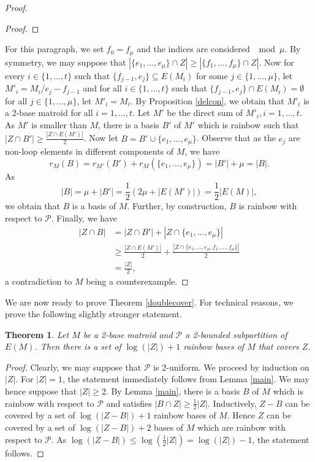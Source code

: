 \documentclass{article}
\newtheorem{Theorem}[Statement]{Theorem}
\begin{document}
\begin{proof}
\begin{proof}
\end{proof}

For this paragraph, we set $f_0=f_{\mu}$ and the indices are considered $\mod \mu$. By symmetry, we may suppose that $|\{e_1,\ldots,e_\mu\}\cap Z| \geq |\{f_1,\ldots,f_\mu\}\cap Z|$. Now for every $i \in \{1,\ldots,t\}$ such that $\{f_{j-1},e_j\}\subseteq E(M_i)$ for some $j \in \{1,\ldots,\mu\}$, let $M'_i=M_i/e_j-f_{j-1 }$ and for all $i \in \{1,\ldots,t\}$ such that $\{f_{j-1},e_j\}\cap E(M_i)=\emptyset$ for all $j \in \{1,\ldots,\mu\}$, let $M'_i=M_i$. By Proposition \ref{delcon}, we obtain that $M'_i$ is a 2-base matroid for all $i =1,\ldots,t$. Let $M'$ be the direct sum of $M'_i,i=1,\ldots,t$. As $M'$ is smaller than $M$, there is a basis $B'$ of $M'$ which is rainbow such that $|Z \cap B'|\geq \frac{|Z\cap E(M')|}{2}$. Now let $B=B'\cup \{e_1,\ldots,e_\mu\}$. Observe that as the $e_j$ are non-loop elements in different components of $M$, we have $$r_M(B)=r_{M'}(B')+r_M(\{e_1,\ldots,e_\mu\})=|B'|+\mu=|B|.$$ As $$|B|=\mu+|B'|=\frac{1}{2}(2\mu+|E(M')|)=\frac{1}{2}|E(M)|,$$ we obtain that $B$ is a basis of $M$. Further, by construction, $B$ is rainbow with respect to $\mathcal{P}$. Finally, we have \begin{align*}|Z \cap B|&=|Z \cap B'|+|Z \cap \{e_1,\ldots,e_\mu\}|\\ &\geq \frac{|Z \cap E(M')|}{2}+\frac{|Z \cap \{e_1,\ldots,e_\mu,f_1,\ldots,f_\mu\}|}{2}\\&=\frac{|Z|}{2},\end{align*} a contradiction to $M$ being a counterexample.
\end{proof}

We are now ready to prove Theorem \ref{doublecover}. For technical reasons, we prove the following slightly stronger statement.

\begin{Theorem}
Let $M$ be a 2-base matroid and $\mathcal{P}$ a 2-bounded subpartition of $E(M)$. Then there is a set of $\log(|Z|)+1$ rainbow bases of $M$ that covers $Z$.
\end{Theorem}
\begin{proof}
Clearly, we may suppose that $\mathcal{P}$ is 2-uniform. We proceed by induction on $|Z|$. For $|Z|=1$, the statement immediately follows from Lemma \ref{main}. We may hence suppose that $|Z|\geq 2$. By Lemma \ref{main}, there is a basis $B$ of $M$ which is rainbow with respect to $\mathcal{P}$ and satisfies $|B \cap Z|\geq \frac{1}{2}|Z|$. Inductively, $Z-B$ can be covered by a set of $\log(|Z-B|)+1$ rainbow bases of $M$. Hence $Z$ can be covered by a set of $\log(|Z-B|)+2$ bases of $M$ which are rainbow with respect to $\mathcal{P}$. As $\log(|Z-B|)\leq \log(\frac{1}{2}|Z|)=\log(|Z|)-1$, the statement follows.
\end{proof}
\end{document}
